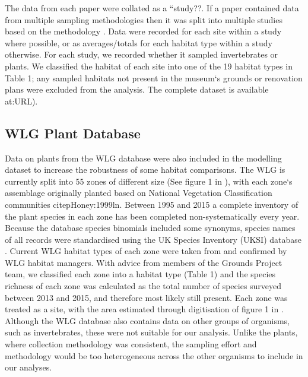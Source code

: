The data from each paper were collated as a ``study??. If a paper contained data from multiple sampling methodologies then it was split into multiple studies based on the methodology \citep[following][]{Hudson:2014predicts}. Data were recorded for each site within a study where possible, or as averages/totals for each habitat type within a study otherwise. For each study, we recorded whether it sampled invertebrates or plants. We classified the habitat of each site into one of the 19 habitat types in Table 1; any sampled habitats not present in the museum`s grounds or renovation plans were excluded from the analysis. The complete dataset is available at:URL).

\subsection{WLG Plant Database}
Data on plants from the WLG database were also included in the modelling dataset to increase the robustness of some habitat comparisons. The WLG is currently split into 55 zones of different size (See figure 1 in \citealt{Leigh:2003ln}), with each zone`s assemblage originally planted based on National Vegetation Classification communities citep{Honey:1999ln}. Between 1995 and 2015 a complete inventory of the plant species in each zone has been completed non-systematically every year. Because the database species binomials included some synonyms, species names of all records were standardised using the UK Species Inventory (UKSI) database \citep{Raper:2014wg}. Current WLG habitat types of each zone were taken from \citep{Leigh:2003ln} and confirmed by WLG habitat managers. With advice from members of the Grounds Project team, we classified each zone into a habitat type (Table 1) and the species richness of each zone was calculated as the total number of species surveyed between 2013 and 2015, and therefore most likely still present. Each zone was treated as a site, with the area estimated through digitisation of figure 1 in \cite{Leigh:2003ln}. Although the WLG database also contains data on other groups of organisms, such as invertebrates, these were not suitable for our analysis. Unlike the plants, where collection methodology was consistent, the sampling effort and methodology would be too heterogeneous across the other organisms to include in our analyses.

